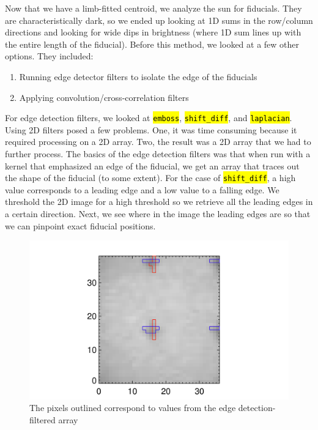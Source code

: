 \documentclass[10pt]{scrartcl}
\begin{document}
Now that we have a limb-fitted centroid, we analyze the sun for fiducials. They are characteristically dark, so we ended up looking at 1D sums in the row/column directions and looking for wide dips in brightness (where 1D sum lines up with the entire length of the fiducial). Before this method, we looked at a few other options. They included:

\begin{enumerate}
    \item Running edge detector filters to isolate the edge of the fiducials
    \item Applying convolution/cross-correlation filters 
\end{enumerate}

For edge detection filters, we looked at \hl{\texttt{emboss}}, \hl{\texttt{shift\_diff}}, and \hl{\texttt{laplacian}}. Using 2D filters posed a few problems. One, it was time consuming because it required processing on a 2D array. Two, the result was a 2D array that we had to further process. The basics of the edge detection filters was that when run with a kernel that emphasized an edge of the fiducial, we get an array that traces out the shape of the fiducial (to some extent). For the case of \hl{\texttt{shift\_diff}}, a high value corresponds to a leading edge and a low value to a falling edge. We threshold the 2D image for a high threshold so we retrieve all the leading edges in a certain direction. Next, we see where in the image the leading edges are so that we can pinpoint exact fiducial positions. 

\begin{figure}[!ht]
   \includegraphics[width=.75\textwidth]{../plots_tables_images/threshtesh_3.png}%
   \caption{The pixels outlined correspond to values from the edge detection-filtered array}\label{edge_det}
\end{figure}
\end{document}
